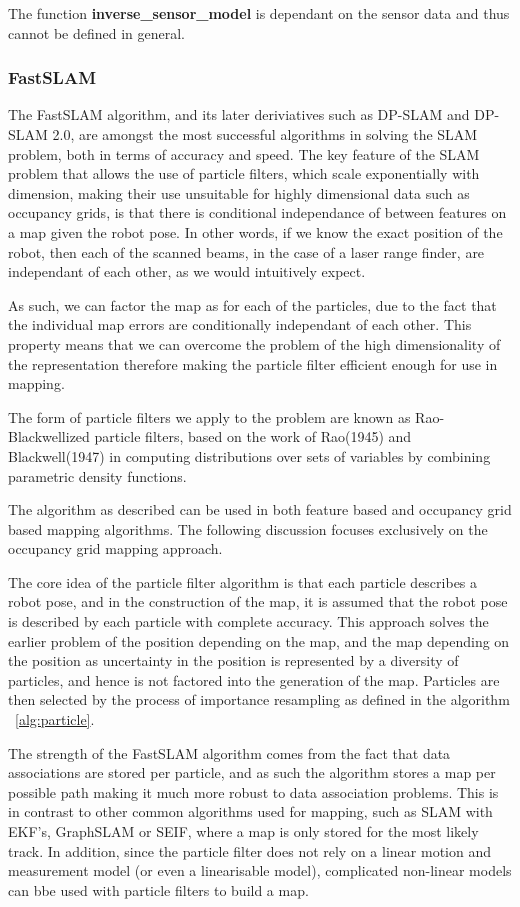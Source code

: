 \documentclass[english]{article}
\begin{document}
The function \textbf{inverse\_sensor\_model} is dependant on the sensor data and thus cannot be defined in general.

\subsubsection{FastSLAM}
The FastSLAM algorithm, and its later deriviatives such as DP-SLAM and DP-SLAM 2.0, are amongst the most successful algorithms in solving the SLAM problem, both in terms of accuracy and speed. The key feature of the SLAM problem that allows the use of particle filters, which scale exponentially with dimension, making their use unsuitable for highly dimensional data such as occupancy grids, is that there is conditional independance of between features on a map given the robot pose. In other words, if we know the exact position of the robot, then each of the scanned beams, in the case of a laser range finder, are independant of each other, as we would intuitively expect.

As such, we can factor the map as for each of the particles, due to the fact that the individual map errors are conditionally independant of each other. This property means that we can overcome the problem of the high dimensionality of the representation therefore making the particle filter efficient enough for use in mapping.

The form of particle filters we apply to the problem are known as Rao-Blackwellized particle filters, based on the work of Rao(1945) and Blackwell(1947) in computing distributions over sets of variables by combining parametric density functions.

The algorithm as described can be used in both feature based and occupancy grid based mapping algorithms. The following discussion focuses exclusively on the occupancy grid mapping approach.

The core idea of the particle filter algorithm is that each particle describes a robot pose, and in the construction of the map, it is assumed that the robot pose is described by each particle with complete accuracy. This approach solves the earlier problem of the position depending on the map, and the map depending on the position as uncertainty in the position is represented by a diversity of particles, and hence is not factored into the generation of the map. Particles are then selected by the process of importance resampling as defined in the algorithm ~\ref{alg:particle}.

The strength of the FastSLAM algorithm comes from the fact that data associations are stored per particle, and as such the algorithm stores a map per possible path making it much more robust to data association problems. This is in contrast to other common algorithms used for mapping, such as SLAM with EKF's, GraphSLAM or SEIF, where a map is only stored for the most likely track. In addition, since the particle filter does not rely on a linear motion and measurement model (or even a linearisable model), complicated non-linear models can bbe used with particle filters to build a map.
\end{document}
